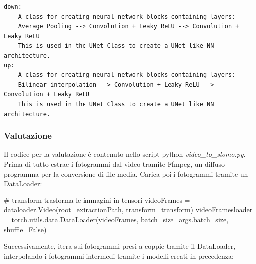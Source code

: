 \begin{verbatim}
down:
    A class for creating neural network blocks containing layers:
    Average Pooling --> Convolution + Leaky ReLU --> Convolution + Leaky ReLU
    This is used in the UNet Class to create a UNet like NN architecture.
up:
    A class for creating neural network blocks containing layers: 
    Bilinear interpolation --> Convolution + Leaky ReLU --> Convolution + Leaky ReLU
    This is used in the UNet Class to create a UNet like NN architecture.
\end{verbatim}

\subsubsection*{Valutazione}

Il codice per la valutazione è contenuto nello script python \emph{video\_to\_slomo.py}.
Prima di tutto estrae i fotogrammi dal video tramite Ffmpeg, un diffuso programma per la 
conversione di file media. Carica poi i fotogrammi tramite un DataLoader:

\begin{Python}
    # transform trasforma le immagini in tensori
    videoFrames = dataloader.Video(root=extractionPath, transform=transform)
    videoFramesloader = torch.utils.data.DataLoader(videoFrames, batch_size=args.batch_size, shuffle=False)
\end{Python}

Successivamente, itera sui fotogrammi presi a coppie tramite il DataLoader, interpolando i 
fotogrammi intermedi tramite i modelli creati in precedenza:

